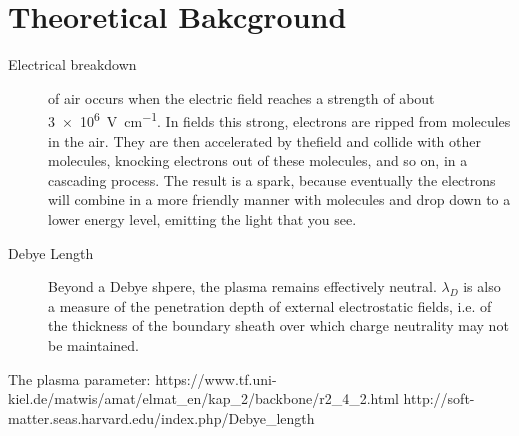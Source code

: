 ﻿\documentclass[openany]{book}
\begin{document}
\chapter{Theoretical Bakcground}
\begin{description}
\item[Electrical  breakdown] of air occurs when the electric field reaches a strength of about \SI{3e6}{\volt\per\cm}. In fields this strong, electrons are ripped from molecules in the air. They are then accelerated by thefield and collide with other molecules, knocking electrons out of these molecules,  and  so  on,  in  a  cascading  process.  The  result  is  a spark, because eventually the electrons will combine in a more friendly manner with molecules and drop down to a lower energy level, emitting the light that you see.
\item[Debye Length] Beyond a Debye shpere, the plasma remains effectively neutral. $\lambda_D$ is also a measure of the penetration depth of external electrostatic fields, i.e. of the thickness of the boundary sheath over which charge neutrality may not be maintained.
\end{description}

The plasma parameter:
https://www.tf.uni-kiel.de/matwis/amat/elmat_en/kap_2/backbone/r2_4_2.html
http://soft-matter.seas.harvard.edu/index.php/Debye_length
\end{document}
